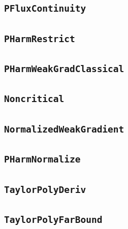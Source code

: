 \documentclass[11pt]{amsart}
\theoremstyle{definition}
\begin{document}
\subsection{\texorpdfstring{\texttt{PFluxContinuity}}{PFluxContinuity}}\label{node:PFluxContinuity}


\subsection{\texorpdfstring{\texttt{PHarmRestrict}}{PHarmRestrict}}\label{node:PHarmRestrict}


\subsection{\texorpdfstring{\texttt{PHarmWeakGradClassical}}{PHarmWeakGradClassical}}\label{node:PHarmWeakGradClassical}


\subsection{\texorpdfstring{\texttt{Noncritical}}{Noncritical}}\label{node:Noncritical}


\subsection{\texorpdfstring{\texttt{NormalizedWeakGradient}}{NormalizedWeakGradient}}\label{node:NormalizedWeakGradient}


\subsection{\texorpdfstring{\texttt{PHarmNormalize}}{PHarmNormalize}}\label{node:PHarmNormalize}


\subsection{\texorpdfstring{\texttt{TaylorPolyDeriv}}{TaylorPolyDeriv}}\label{node:TaylorPolyDeriv}


\subsection{\texorpdfstring{\texttt{TaylorPolyFarBound}}{TaylorPolyFarBound}}\label{node:TaylorPolyFarBound}

\end{document}
